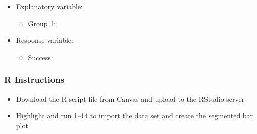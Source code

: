 \documentclass[
]{report}
\providecommand{\tightlist}{%
  \setlength{\itemsep}{0pt}\setlength{\parskip}{0pt}}
\begin{document}
\vspace{2mm}

\begin{itemize}
\item
  Explanatory variable:

  \begin{itemize}
  \tightlist
  \item
    Group 1:
  \end{itemize}
\end{itemize}

\vspace{2mm}

\begin{itemize}
\item
  Response variable:

  \begin{itemize}
  \tightlist
  \item
    Success:
  \end{itemize}
\end{itemize}

\vspace{2mm}

\subsubsection*{R Instructions}\label{r-instructions-9}

\begin{itemize}
\item
  Download the R script file from Canvas and upload to the RStudio server
\item
  Highlight and run 1--14 to import the data set and create the segmented bar plot
\end{itemize}
\end{document}
